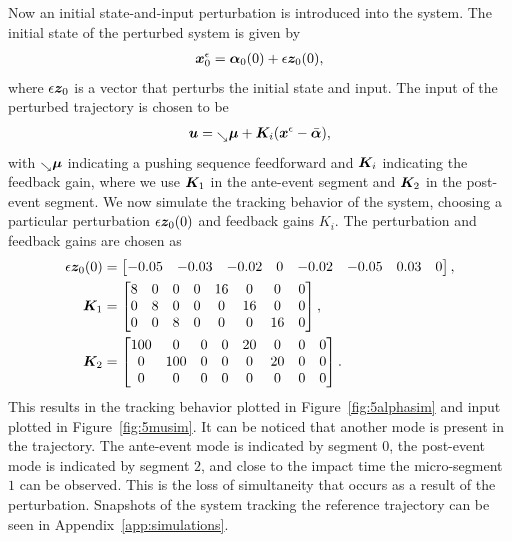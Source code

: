 \documentclass[../DC2019003Bouma.tex]{subfiles}
\begin{document}
Now an initial state-and-input perturbation is introduced into the system. The initial state of the perturbed system is given by
\begin{align}
{\boldsymbol{x}}^\epsilon_0 = \boldsymbol{\alpha}_0(0) + \epsilon{\boldsymbol{z}}_0(0),
\end{align}
where $\epsilon{\boldsymbol{z}}_0$ is a vector that perturbs the initial state and input. The input of the perturbed trajectory is chosen to be
\begin{align}
{\boldsymbol{u}} = \hspace{0cm}_{\searrow}\boldsymbol{\mu} + {\boldsymbol{K}}_i({\boldsymbol{x}}^\epsilon-\bar{\boldsymbol{\alpha}}),
\end{align}
with $\hspace{0cm}_{\searrow}\boldsymbol{\mu}$ indicating a pushing sequence feedforward and ${\boldsymbol{K}}_i$ indicating the feedback gain, where we use ${\boldsymbol{K}}_1$ in the ante-event segment and ${\boldsymbol{K}}_2$ in the post-event segment. We now simulate the tracking behavior of the system, choosing a particular perturbation $\epsilon{\boldsymbol{z}}_0(0)$ and feedback gains $K_i$. The perturbation and feedback gains are chosen as
\begin{align}
\epsilon{\boldsymbol{z}}_0(0) &= \begin{bmatrix}-0.05 & -0.03 & -0.02 & 0 & -0.02 & -0.05 & 0.03 & 0 \end{bmatrix},\\
{\boldsymbol{K}}_1 &= \begin{bmatrix}
8 & 0 & 0 & 0 & 16 & 0  & 0  & 0\\
0 & 8 & 0 & 0 & 0  & 16 & 0  & 0\\
0 & 0 & 8 & 0 & 0  & 0  & 16 & 0
\end{bmatrix},\\
{\boldsymbol{K}}_2 &= \begin{bmatrix}
100 & 0   & 0 & 0 & 20 & 0  & 0 & 0\\
0   & 100 & 0 & 0 & 0  & 20 & 0 & 0\\
0   & 0   & 0 & 0 & 0  & 0  & 0 & 0
\end{bmatrix}.
\end{align}
This results in the tracking behavior plotted in Figure~\ref{fig:5alphasim} and input plotted in Figure~\ref{fig:5musim}. It can be noticed that another mode is present in the trajectory. The ante-event mode is indicated by segment $0$, the post-event mode is indicated by segment $2$, and close to the impact time the micro-segment $1$ can be observed. This is the loss of simultaneity that occurs as a result of the perturbation. Snapshots of the system tracking the reference trajectory can be seen in Appendix~\ref{app:simulations}.
\end{document}
